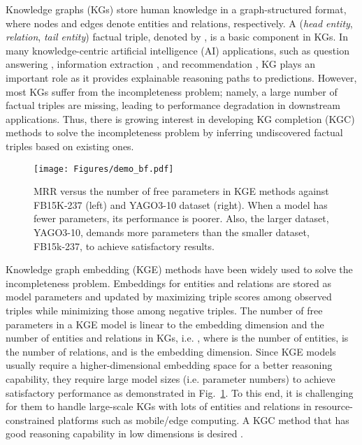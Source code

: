 \documentclass{article}
\begin{document}
Knowledge graphs (KGs) store human knowledge in a graph-structured
format, where nodes and edges denote entities and relations,
respectively. A (\emph{head entity}, \emph{relation}, \emph{tail
entity}) factual triple, denoted by , is a basic
component in KGs. In many knowledge-centric artificial intelligence (AI)
applications, such as question answering \citep{huang2019knowledge,
saxena2020improving}, information extraction 
\citep{hoffmann2011knowledge, daiber2013improving}, 
and recommendation \citep{wang2019explainable,
xian2019reinforcement}, KG plays an important role as it provides
explainable reasoning paths to predictions. However, most KGs suffer
from the incompleteness problem; namely, a large number of factual
triples are missing, leading to performance degradation in downstream
applications. Thus, there is growing interest in developing KG
completion (KGC) methods to solve the incompleteness problem by inferring 
undiscovered factual triples based on existing ones. 
\begin{figure}[t]
\centering
\texttt{[image: Figures/demo\_bf.pdf]}
\caption{MRR versus the number of free parameters in
KGE methods against FB15K-237 (left) and YAGO3-10
dataset (right). When a model has fewer parameters, its performance is
poorer. Also, the larger dataset, YAGO3-10, demands more
parameters than the smaller dataset, FB15k-237, to achieve satisfactory results.}
\label{fig:dimension}
\end{figure}
Knowledge graph embedding (KGE) methods have been widely used to solve
the incompleteness problem. Embeddings for entities and relations are
stored as model parameters and updated by maximizing triple scores among
observed triples while minimizing those among negative triples. The number of
free parameters in a KGE model is linear to the embedding dimension and the
number of entities and relations in KGs, i.e. , where
 is the number of entities,  is the number of relations, and
 is the embedding dimension. Since KGE models usually require a
higher-dimensional embedding space for a better reasoning capability,
they require large model sizes (i.e. parameter numbers) to achieve
satisfactory performance as demonstrated in Fig.~\ref{fig:dimension}.
To this end, it is challenging for them to handle large-scale KGs with
lots of entities and relations in resource-constrained platforms such as
mobile/edge computing. A KGC method that has good reasoning capability
in low dimensions is desired \cite{kuo2022green}. 
\end{document}
